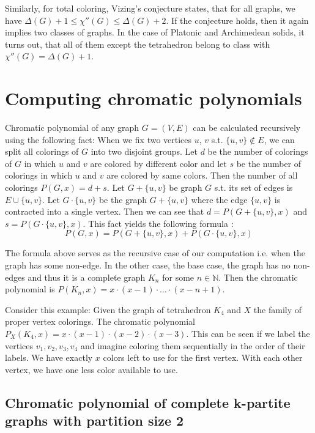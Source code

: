 Similarly, for total coloring, Vizing's conjecture \cite{vizing68} states, that for all graphs, we have $\Delta(G) + 1 \leq \chi''(G) \leq \Delta(G) + 2$. If the conjecture holds, then it again implies two classes of graphs. In the case of Platonic and Archimedean solids, it turns out, that all of them except the tetrahedron belong to class with $\chi''(G) = \Delta(G) + 1$.

\section{Computing chromatic polynomials}


Chromatic polynomial of any graph $G=(V,E)$ can be calculated recursively using the following fact: When we fix two vertices $u$, $v$ s.t. $\{u,v\} \notin E$, we can split all colorings of $G$ into two disjoint groups. Let $d$ be the number of colorings of $G$ in which $u$ and $v$ are colored by different color and let $s$ be the number of colorings in which $u$ and $v$ are colored by same colors. Then the number of all colorings $P(G,x) = d + s$. Let $G+\{u,v\}$ be graph $G$ s.t. its set of edges is $E \cup \{u,v\}$. Let $G \cdot \{u,v\}$ be the graph $G + \{u,v\}$ where the edge $\{u,v\}$ is contracted into a single vertex. Then we can see that $d = P(G + \{u,v\},x)$ and $s = P(G \cdot \{u,v\},x)$. This fact yields the following formula \cite{chartrand2019}:
\begin{equation}\label{eqn:chrom_poly_nonedge}
 P(G,x) = P(G + \{u,v\},x) + P(G \cdot \{u,v\},x)
\end{equation}

The formula above serves as the recursive case of our computation i.e. when the graph has some non-edge. In the other case, the base case, the graph has no non-edges and thus it is a complete graph $K_n$ for some $n \in \mathbb{N}$. Then the chromatic polynomial is $P(K_n,x) = x \cdot (x-1) \cdot \ldots \cdot (x-n+1)$.

Consider this example: Given the graph of tetrahedron $K_4$ and $X$ the family of proper vertex colorings. The chromatic polynomial $P_{X}(K_4,x) = x \cdot (x-1) \cdot (x-2) \cdot (x-3)$. This can be seen if we label the vertices $v_1,v_2,v_3,v_4$ and imagine coloring them sequentially in the order of their labels. We have exactly $x$ colors left to use for the first vertex. With each other vertex, we have one less color available to use. 

\subsection{Chromatic polynomial of complete k-partite graphs with partition size 2}

